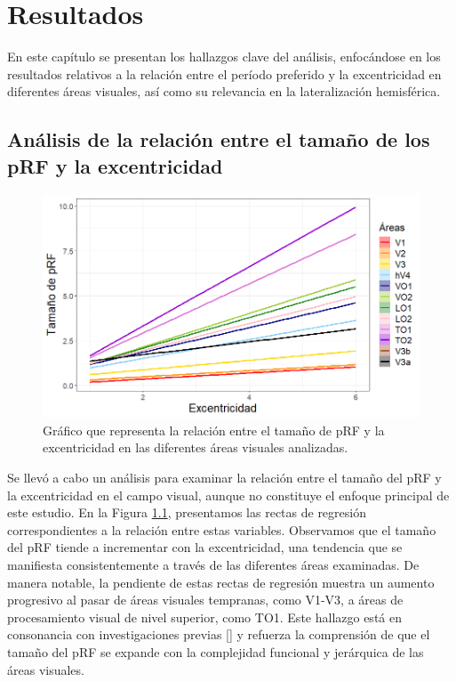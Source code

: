 \chapter{Resultados}\label{chapter:results}

En este cap\'itulo se presentan los hallazgos clave del  análisis, enfoc\'andose en los resultados relativos a la relación entre el per\'iodo preferido y la excentricidad en diferentes áreas visuales, así como su relevancia en la lateralización hemisférica.

\section{Análisis de la relación entre el tamaño de los pRF y la excentricidad}

\begin{figure}[h]
	\centering
	\includegraphics[scale=0.6]{Graphics/size_vs_eccen_bayesian}
	\caption{Gráfico que representa la relación entre el tama\~no de pRF y la excentricidad en las diferentes áreas visuales analizadas.}
	\label{fig:sigma_vs_eccen}
\end{figure}

Se llevó a cabo un análisis para examinar la relación entre el tamaño del pRF y la excentricidad en el campo visual, aunque no constituye el enfoque principal de este estudio. En la Figura \ref{fig:sigma_vs_eccen}, presentamos las rectas de regresión correspondientes a la relaci\'on entre estas variables. Observamos que el tamaño del pRF tiende a incrementar con la excentricidad, una tendencia que se manifiesta consistentemente a través de las diferentes áreas examinadas. De manera notable, la pendiente de estas rectas de regresión muestra un aumento progresivo al pasar de áreas visuales tempranas, como V1-V3, a áreas de procesamiento visual de nivel superior, como TO1. Este hallazgo está en consonancia con investigaciones previas [\cite{wandell_computational_2015}] y refuerza la comprensión de que el tamaño del pRF se expande con la complejidad funcional y jerárquica de las áreas visuales.

